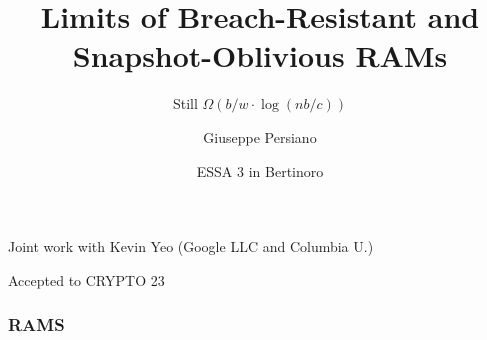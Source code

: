 \documentclass[]{beamer}
\title[]{Limits of Breach-Resistant and Snapshot-Oblivious RAMs}
\subtitle{\color{teal} Still $\Omega(b/w\cdot\log (nb/c))$}
\author{\color{purple} Giuseppe Persiano}
\institute[S+G]{\color{purple} Universit\`a di Salerno and Google LLC}
\date[ESSA 3]{\color{red} ESSA 3 in Bertinoro}
\begin{document}
\newcommand{\ignore}[1]{}

\begin{frame}
  \titlepage

{\color{brown}
Joint work with Kevin Yeo (Google LLC and Columbia U.)

Accepted to CRYPTO 23
}
\end{frame}

\begin{frame}
\frametitle{RAMS}

\begin{center}
\end{center}

\end{frame}
\end{document}
